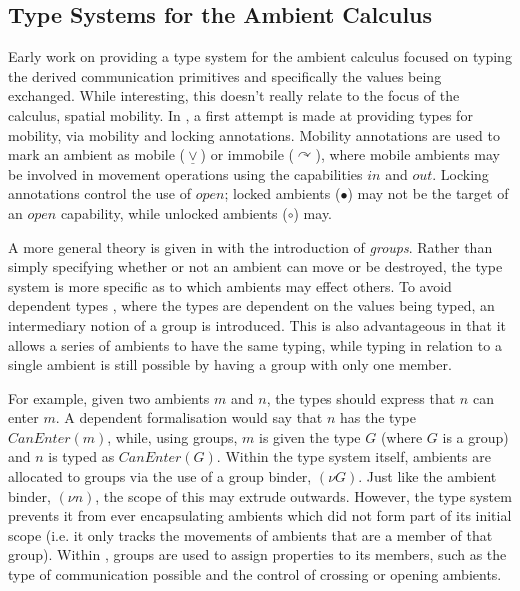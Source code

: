 
\subsection{Type Systems for the Ambient Calculus}
\label{ambienttypes}

Early work \cite{commtypesamb} on providing a type system for the
ambient calculus focused on typing the derived communication primitives
and specifically the values being exchanged.  While interesting, this
doesn't really relate to the focus of the calculus, spatial mobility.
In \cite{cardelli:typesforambients,cardelli:ambienttypes}, a first
attempt is made at providing types for mobility, via mobility and locking
annotations.  Mobility annotations are used to mark an ambient as mobile
($\underline{\vee}$) or immobile ($\curvearrowright$), where mobile
ambients may be involved in movement operations using the capabilities
$in$ and $out$.  Locking annotations control the use of $open$; locked
ambients ($\bullet$) may not be the target of an $open$ capability,
while unlocked ambients ($\circ$) may.

A more general theory is given in \cite{ambienttypes} with the
introduction of \emph{groups}.  Rather than simply specifying whether or
not an ambient can move or be destroyed, the type system is more
specific as to which ambients may effect others.  To avoid dependent
types \cite{deptypes}, where the types are dependent on the values being
typed, an intermediary notion of a group is introduced.  This is also
advantageous in that it allows a series of ambients to have the same
typing, while typing in relation to a single ambient is still possible
by having a group with only one member.

For example, given two ambients $m$ and $n$, the types should express
that $n$ can enter $m$.  A dependent formalisation would say that $n$
has the type $CanEnter(m)$, while, using groups, $m$ is given the type
$G$ (where $G$ is a group) and $n$ is typed as $CanEnter(G)$.  Within
the type system itself, ambients are allocated to groups via the use
of a group binder, $(\nu G)$.  Just like the ambient binder, $(\nu
n)$, the scope of this may extrude outwards.  However, the type system
prevents it from ever encapsulating ambients which did not form part
of its initial scope (i.e. it only tracks the movements of ambients
that are a member of that group).  Within \cite{ambienttypes}, groups
are used to assign properties to its members, such as the type of
communication possible and the control of crossing or opening
ambients.

